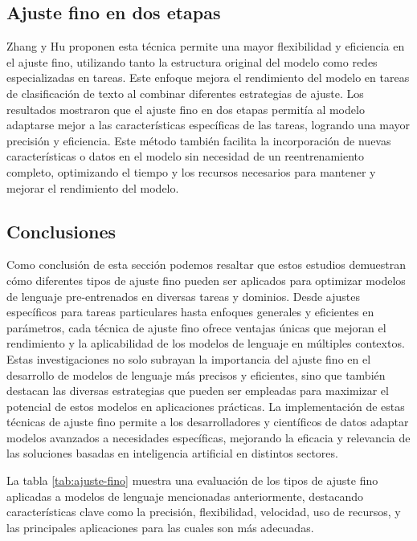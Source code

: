 \subsection{Ajuste fino en dos etapas}

 Zhang y Hu \cite{Zhang2021} proponen esta técnica permite una mayor flexibilidad y eficiencia en el ajuste fino, utilizando tanto la estructura original del modelo como redes especializadas en tareas. Este enfoque mejora el rendimiento del modelo en tareas de clasificación de texto al combinar diferentes estrategias de ajuste. Los resultados mostraron que el ajuste fino en dos etapas permitía al modelo adaptarse mejor a las características específicas de las tareas, logrando una mayor precisión y eficiencia. Este método también facilita la incorporación de nuevas características o datos en el modelo sin necesidad de un reentrenamiento completo, optimizando el tiempo y los recursos necesarios para mantener y mejorar el rendimiento del modelo.

\subsection{Conclusiones}

Como conclusión de esta sección podemos resaltar que estos estudios demuestran cómo diferentes tipos de ajuste fino pueden ser aplicados para optimizar modelos de lenguaje pre-entrenados en diversas tareas y dominios. Desde ajustes específicos para tareas particulares hasta enfoques generales y eficientes en parámetros, cada técnica de ajuste fino ofrece ventajas únicas que mejoran el rendimiento y la aplicabilidad de los modelos de lenguaje en múltiples contextos. Estas investigaciones no solo subrayan la importancia del ajuste fino en el desarrollo de modelos de lenguaje más precisos y eficientes, sino que también destacan las diversas estrategias que pueden ser empleadas para maximizar el potencial de estos modelos en aplicaciones prácticas. La implementación de estas técnicas de ajuste fino permite a los desarrolladores y científicos de datos adaptar modelos avanzados a necesidades específicas, mejorando la eficacia y relevancia de las soluciones basadas en inteligencia artificial en distintos sectores.

La tabla \ref{tab:ajuste-fino} muestra una evaluación de los tipos de ajuste fino aplicadas a modelos de lenguaje mencionadas anteriormente, destacando características clave como la precisión, flexibilidad, velocidad, uso de recursos, y las principales aplicaciones para las cuales son más adecuadas. 

